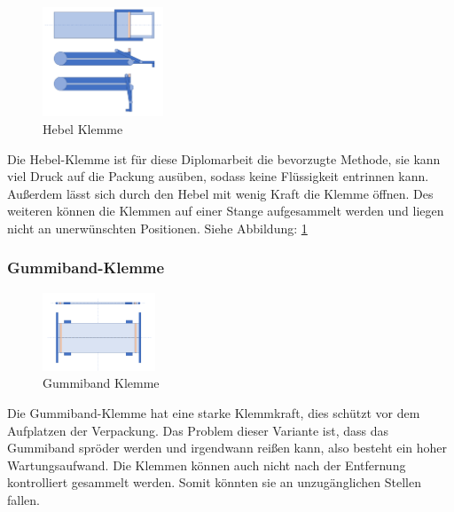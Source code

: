 \begin{figure}
\vspace{-30pt}
  \begin{center}
    \includegraphics[width=0.32\textwidth]{Bilder/Powerpoint/Hebel_Klemme}
  \end{center}
  \caption{Hebel Klemme}
  \label{Hebel Klemme}
  \vspace{-10pt}
\end{figure}

Die Hebel-Klemme ist für diese Diplomarbeit die bevorzugte Methode, sie kann viel Druck auf die Packung ausüben, sodass keine Flüssigkeit entrinnen kann. Außerdem lässt sich durch den Hebel mit wenig Kraft die Klemme öffnen. Des weiteren können die Klemmen auf einer Stange aufgesammelt werden und liegen nicht an unerwünschten Positionen. Siehe Abbildung: \ref{Hebel Klemme}
 \vspace{40pt}


\subsubsection{Gummiband-Klemme}
 
\begin{figure}
\vspace{-40pt}
  \begin{center}
    \includegraphics[width=0.30\textwidth]{Bilder/Powerpoint/Gummiband_Klemme}
  \end{center}
  \caption{Gummiband Klemme}
  \label{Gummiband Klemme}
  \vspace{-10pt}
\end{figure}

Die Gummiband-Klemme hat eine starke Klemmkraft, dies schützt vor dem Aufplatzen der Verpackung. Das Problem dieser Variante ist, dass das Gummiband spröder werden und irgendwann reißen kann, also besteht ein hoher Wartungsaufwand. Die Klemmen können auch nicht nach der Entfernung kontrolliert gesammelt werden. Somit könnten sie an unzugänglichen Stellen fallen.

